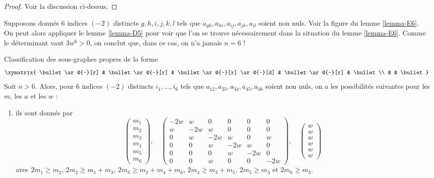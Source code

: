 \begin{proof}
Voir la discussion ci-dessus.
\end{proof}

\noindent
Supposons donnés $6$ indices $(-2)$ distincts $g, h, i, j, k, l$
tels que $a_{gh}, a_{hi}, a_{ij}, a_{jk}, a_{il}$ soient non nuls.
Voir la figure du lemme \ref{lemma-E6}. On peut alors appliquer le
lemme \ref{lemma-D5} pour voir que l'on se trouve nécessairement dans la situation
du lemme \ref{lemma-E6}. Comme le déterminant vaut $3w^6 > 0$,
on conclut que, dans ce cas, on n'a jamais $n = 6$ !

\begin{lemma}
\label{lemma-E6}
Classification des sous-graphes propres de la forme
$$
\xymatrix{
\bullet \ar@{-}[r] & \bullet \ar@{-}[r] & \bullet \ar@{-}[r] \ar@{-}[d] &
\bullet \ar@{-}[r] & \bullet \\
& & \bullet
}
$$
Soit $n > 6$. Alors, pour $6$ indices $(-2)$ distincts
$i_1, \ldots, i_6$ tels que
$a_{12}, a_{23}, a_{34},
a_{45}, a_{36}$ soient non nuls, on a
les possibilités suivantes pour les $m$, les $a$ et les $w$ :
\begin{enumerate}
\item
\label{item-E6}
ils sont donnés par
$$
\left(
\begin{matrix}
m_1 \\
m_2 \\
m_3 \\
m_4 \\
m_5 \\
m_6
\end{matrix}
\right),
\quad
\left(
\begin{matrix}
-2w & w & 0 & 0 & 0 & 0 \\
w & -2w & w & 0 & 0 & 0 \\
0 & w & -2w & w & 0 & w \\
0 & 0 & w & -2w & w & 0 \\
0 & 0 & 0 & w & -2w & 0 \\
0 & 0 & w & 0 & 0 & -2w
\end{matrix}
\right),
\quad
\left(
\begin{matrix}
w \\
w \\
w \\
w \\
w \\
w
\end{matrix}
\right)
$$
avec $2m_1 \geq m_2$, $2m_2 \geq m_1 + m_3$, $2m_3 \geq m_2 + m_4 + m_6$,
$2m_4 \geq m_3 + m_5$, $2m_5 \geq m_3$ et $2m_6 \geq m_3$.
\end{enumerate}
\end{lemma}

